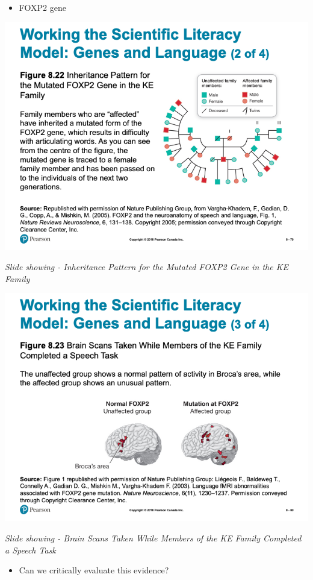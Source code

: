 \documentclass[
]{book}
\providecommand{\tightlist}{%
  \setlength{\itemsep}{0pt}\setlength{\parskip}{0pt}}
\begin{document}
\begin{reflect}
\begin{itemize}
  \begin{itemize}
  \tightlist
  \item
    FOXP2 gene
  \end{itemize}
\end{itemize}

\includegraphics{assets/unit_1/slide_79.png}

\emph{Slide showing - Inheritance Pattern for the Mutated FOXP2 Gene in the KE Family}

\includegraphics{assets/unit_1/slide_80.png}

\emph{Slide showing - Brain Scans Taken While Members of the KE Family Completed a Speech Task}

\begin{itemize}
\tightlist
\item
  Can we critically evaluate this evidence?


\end{itemize}
\end{reflect}
\end{document}
